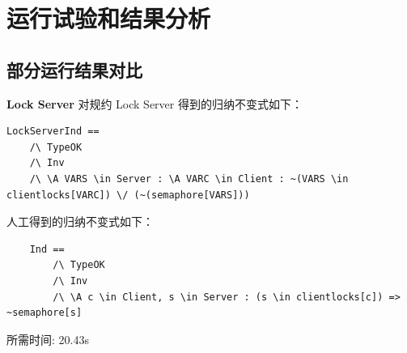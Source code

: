 \chapter{运行试验和结果分析}\label{chap:run-analysis}

\section{部分运行结果对比}
\textbf{Lock Server}
\rltla 对规约 Lock Server 得到的归纳不变式如下：
\begin{lstlisting}
LockServerInd == 
    /\ TypeOK 
    /\ Inv
    /\ \A VARS \in Server : \A VARC \in Client : ~(VARS \in clientlocks[VARC]) \/ (~(semaphore[VARS])) 
\end{lstlisting}
人工得到的归纳不变式如下：
\begin{lstlisting}
    Ind == 
        /\ TypeOK
        /\ Inv
        /\ \A c \in Client, s \in Server : (s \in clientlocks[c]) => ~semaphore[s]
\end{lstlisting}
所需时间: 20.43s

